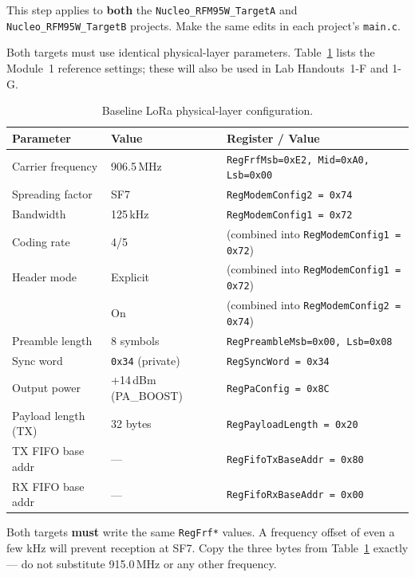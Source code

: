 \documentclass[11pt,letterpaper]{article}
\begin{document}
This step applies to \textbf{both} the \texttt{Nucleo\_RFM95W\_TargetA} and \texttt{Nucleo\_RFM95W\_TargetB} projects. Make the same edits in each project's \texttt{main.c}.

Both targets must use identical physical-layer parameters. Table~\ref{tab:lora-params} lists the Module~1 reference settings; these will also be used in Lab Handouts~1-F and 1-G.

\begin{table}[h!]
	\centering
	\caption{Baseline LoRa physical-layer configuration.}
	\label{tab:lora-params}
	\begin{tabular}{l l l}
		\toprule
		\textbf{Parameter} & \textbf{Value} & \textbf{Register / Value} \\
		\midrule
		Carrier frequency & 906.5\,MHz & \texttt{RegFrfMsb=0xE2, Mid=0xA0, Lsb=0x00} \\
		Spreading factor & SF7 & \texttt{RegModemConfig2 = 0x74} \\
		Bandwidth & 125\,kHz & \texttt{RegModemConfig1 = 0x72} \\
		Coding rate & 4/5 & (combined into \texttt{RegModemConfig1 = 0x72}) \\
		Header mode & Explicit & (combined into \texttt{RegModemConfig1 = 0x72}) \\
		\CRC{} & On & (combined into \texttt{RegModemConfig2 = 0x74}) \\
		Preamble length & 8 symbols & \texttt{RegPreambleMsb=0x00, Lsb=0x08} \\
		Sync word & \texttt{0x34} (private) & \texttt{RegSyncWord = 0x34} \\
		Output power & +14\,dBm (\mbox{PA\_BOOST}) & \texttt{RegPaConfig = 0x8C} \\
		Payload length (\mbox{TX}) & 32 bytes & \texttt{RegPayloadLength = 0x20} \\
		\mbox{TX} FIFO base addr & --- & \texttt{RegFifoTxBaseAddr = 0x80} \\
		\mbox{RX} FIFO base addr & --- & \texttt{RegFifoRxBaseAddr = 0x00} \\
		\bottomrule
	\end{tabular}
\end{table}

\begin{tcolorbox}[warning={Frequency Match is Critical}]
	Both targets \textbf{must} write the same \texttt{RegFrf*} values. A frequency offset of even a few kHz will prevent reception at SF7. Copy the three bytes from Table~\ref{tab:lora-params} exactly --- do not substitute 915.0\,MHz or any other frequency.
\end{tcolorbox}
\end{document}

